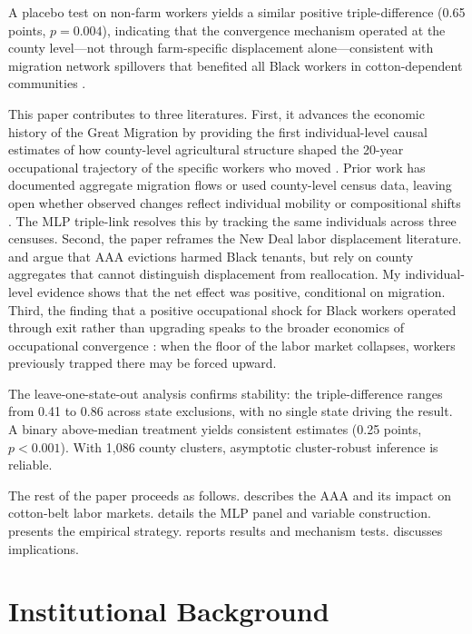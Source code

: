 \documentclass[12pt]{article}
\begin{document}
A placebo test on non-farm workers yields a similar positive triple-difference (0.65 points, $p = 0.004$), indicating that the convergence mechanism operated at the county level---not through farm-specific displacement alone---consistent with migration network spillovers that benefited all Black workers in cotton-dependent communities \citep{boustan2010competition, stuart2022social}.

This paper contributes to three literatures. First, it advances the economic history of the Great Migration by providing the first individual-level causal estimates of how county-level agricultural structure shaped the 20-year occupational trajectory of the specific workers who moved \citep{collins2000african, boustan2016competition}. Prior work has documented aggregate migration flows or used county-level census data, leaving open whether observed changes reflect individual mobility or compositional shifts \citep{hornbeck2014does}. The MLP triple-link resolves this by tracking the same individuals across three censuses. Second, the paper reframes the New Deal labor displacement literature. \citet{alston1999paternalism} and \citet{lee2013aaa} argue that AAA evictions harmed Black tenants, but rely on county aggregates that cannot distinguish displacement from reallocation. My individual-level evidence shows that the net effect was positive, conditional on migration. Third, the finding that a positive occupational shock for Black workers operated through exit rather than upgrading speaks to the broader economics of occupational convergence \citep{goldin2000orchestrating, donohue1991continuous}: when the floor of the labor market collapses, workers previously trapped there may be forced upward.

The leave-one-state-out analysis confirms stability: the triple-difference ranges from 0.41 to 0.86 across state exclusions, with no single state driving the result. A binary above-median treatment yields consistent estimates (0.25 points, $p < 0.001$). With 1,086 county clusters, asymptotic cluster-robust inference is reliable.

The rest of the paper proceeds as follows.  describes the AAA and its impact on cotton-belt labor markets.  details the MLP panel and variable construction.  presents the empirical strategy.  reports results and mechanism tests.  discusses implications.

\section{Institutional Background}
\label{sec:background}
\end{document}
